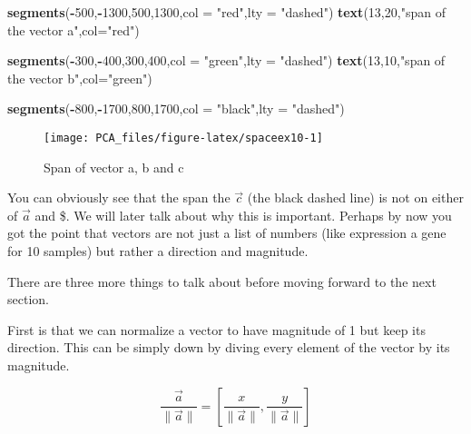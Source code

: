\documentclass[
]{book}
\newenvironment{Shaded}{\begin{snugshade}}{\end{snugshade}}
\newcommand{\DataTypeTok}[1]{\textcolor[rgb]{0.13,0.29,0.53}{#1}}
\newcommand{\DecValTok}[1]{\textcolor[rgb]{0.00,0.00,0.81}{#1}}
\newcommand{\KeywordTok}[1]{\textcolor[rgb]{0.13,0.29,0.53}{\textbf{#1}}}
\newcommand{\NormalTok}[1]{#1}
\newcommand{\OperatorTok}[1]{\textcolor[rgb]{0.81,0.36,0.00}{\textbf{#1}}}
\newcommand{\StringTok}[1]{\textcolor[rgb]{0.31,0.60,0.02}{#1}}
\theoremstyle{definition}
\theoremstyle{definition}
\theoremstyle{definition}
\theoremstyle{remark}
\begin{document}
\begin{Shaded}
\begin{Highlighting}[]
 \KeywordTok{segments}\NormalTok{(}\OperatorTok{-}\DecValTok{500}\NormalTok{,}\OperatorTok{-}\DecValTok{1300}\NormalTok{,}\DecValTok{500}\NormalTok{,}\DecValTok{1300}\NormalTok{,}\DataTypeTok{col =} \StringTok{"red"}\NormalTok{,}\DataTypeTok{lty =} \StringTok{"dashed"}\NormalTok{)}
\KeywordTok{text}\NormalTok{(}\DecValTok{13}\NormalTok{,}\DecValTok{20}\NormalTok{,}\StringTok{"span of the vector a"}\NormalTok{,}\DataTypeTok{col=}\StringTok{"red"}\NormalTok{)}


 \KeywordTok{segments}\NormalTok{(}\OperatorTok{-}\DecValTok{300}\NormalTok{,}\OperatorTok{-}\DecValTok{400}\NormalTok{,}\DecValTok{300}\NormalTok{,}\DecValTok{400}\NormalTok{,}\DataTypeTok{col =} \StringTok{"green"}\NormalTok{,}\DataTypeTok{lty =} \StringTok{"dashed"}\NormalTok{)}
\KeywordTok{text}\NormalTok{(}\DecValTok{13}\NormalTok{,}\DecValTok{10}\NormalTok{,}\StringTok{"span of the vector b"}\NormalTok{,}\DataTypeTok{col=}\StringTok{"green"}\NormalTok{)}


\KeywordTok{segments}\NormalTok{(}\OperatorTok{-}\DecValTok{800}\NormalTok{,}\OperatorTok{-}\DecValTok{1700}\NormalTok{,}\DecValTok{800}\NormalTok{,}\DecValTok{1700}\NormalTok{,}\DataTypeTok{col =} \StringTok{"black"}\NormalTok{,}\DataTypeTok{lty =} \StringTok{"dashed"}\NormalTok{)}
\end{Highlighting}
\end{Shaded}

\begin{figure}

{\centering \texttt{[image: PCA\_files/figure-latex/spaceex10-1]} 

}

\caption{Span of vector a, b and c}\label{fig:spaceex10}
\end{figure}

You can obviously see that the span the \(\vec{c}\) (the black dashed line) is not on either of \(\vec{a}\) and \$. We will later talk about why this is important. Perhaps by now you got the point that vectors are not just a list of numbers (like expression a gene for 10 samples) but rather a direction and magnitude.

There are three more things to talk about before moving forward to the next section.

First is that we can normalize a vector to have magnitude of 1 but keep its direction. This can be simply down by diving every element of the vector by its magnitude.

\[\frac{\vec{a}}{\|\vec{a}\|}=[\frac{x}{\|\vec{a}\|},\frac{y}{\|\vec{a}\|}]\]
\end{document}
